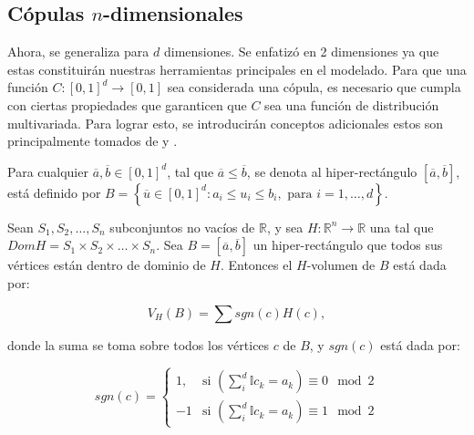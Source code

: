 \subsection{Cópulas $n$-dimensionales}

Ahora, se generaliza para $d$ dimensiones. Se enfatizó en 2 dimensiones ya que estas constituirán nuestras herramientas principales en el modelado. Para que una función $C: [0, 1]^d \to [0, 1]$ sea considerada una cópula, es necesario que cumpla con ciertas propiedades que garanticen que $C$ sea una función de distribución multivariada. Para lograr esto, se introducirán conceptos adicionales estos son principalmente tomados de \cite{nelsenintroduction} y \cite{TesisEmanuel}.

\begin{defn}
    Para cualquier $\overline{a}, \overline{b} \in [0, 1]^d$, tal que $\overline{a} \leq \overline{b}$, se denota al hiper-rectángulo $ [\overline{a}, \overline{b}]$, está definido por $B = \left\{ \overline{u} \in [0, 1]^d : a_i \leq u_i \leq b_i, \text{  para } i = 1 , \dots, d \right\}$.
\end{defn}

\begin{defn}
    Sean $S_1, S_2, \dots, S_n$ subconjuntos no vacíos de $\mathbb{R}$, y sea $H:\mathbb{R}^n  \to \mathbb{R}$ una tal que $Dom H = S_1 \times S_2 \times \dots \times S_n$. Sea $B = [\overline{a}, \overline{b}]$ un hiper-rectángulo que todos sus vértices están dentro de dominio de $H$. Entonces el $H$-volumen de $B$ está dada por: 

    \begin{equation}
        V_H(B) = \sum sgn(c) H(c),
    \end{equation}

    donde la suma se toma sobre todos los vértices $c$ de $B$, y $sgn(c)$ está dada por:

    \begin{equation}
        sgn(c) = \left\{\begin{matrix}
    1, & \text{si } (\sum_{i}^{d} \mathbb{I} c_k = a_k) \equiv 0 \mod 2\\
    -1 & \text{si }  (\sum_{i}^{d} \mathbb{I} c_k = a_k) \equiv 1 \mod 2
\end{matrix}\right.
    \end{equation}
\end{defn}


